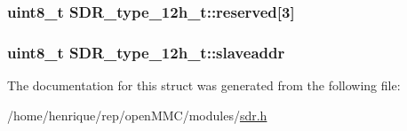 \hypertarget{structSDR__type__12h__t_a76a8699765870919882dd5af6f7fb918}{
\subsubsection[{reserved}]{\setlength{\rightskip}{0pt plus 5cm}uint8\-\_\-t S\-D\-R\-\_\-type\-\_\-12h\-\_\-t\-::reserved\mbox{[}3\mbox{]}}}\label{structSDR__type__12h__t_a76a8699765870919882dd5af6f7fb918}
\hypertarget{structSDR__type__12h__t_af330ddff1ea1c32a903127beac1fd29d}{
\subsubsection[{slaveaddr}]{\setlength{\rightskip}{0pt plus 5cm}uint8\-\_\-t S\-D\-R\-\_\-type\-\_\-12h\-\_\-t\-::slaveaddr}}\label{structSDR__type__12h__t_af330ddff1ea1c32a903127beac1fd29d}


The documentation for this struct was generated from the following file\-:\begin{DoxyCompactItemize}
\item 
/home/henrique/rep/open\-M\-M\-C/modules/\hyperlink{sdr_8h}{sdr.\-h}\end{DoxyCompactItemize}
